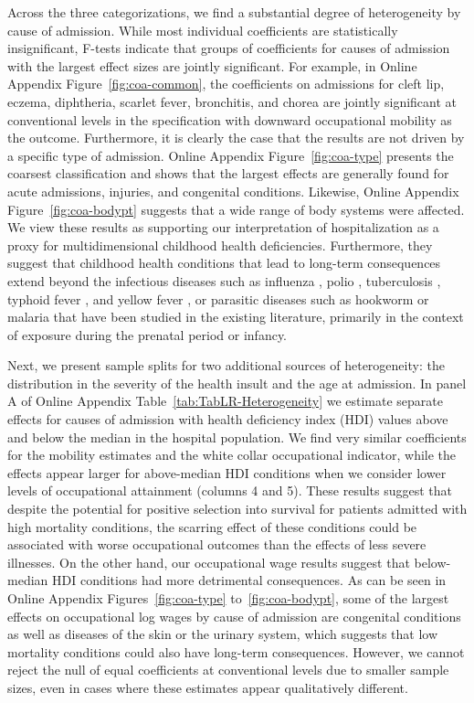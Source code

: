 \documentclass[12pt,english]{article}
\begin{document}
Across the three categorizations, we find a substantial degree of heterogeneity by cause of admission. While most individual coefficients are statistically insignificant, F-tests indicate that groups of coefficients for causes of admission with the largest effect sizes are jointly significant. For example, in Online Appendix Figure~\ref{fig:coa-common}, the coefficients on admissions for cleft lip, eczema, diphtheria, scarlet fever, bronchitis, and chorea are jointly significant at conventional levels in the specification with downward occupational mobility as the outcome. Furthermore, it is clearly the case that the results are not driven by a specific type of admission. Online Appendix Figure~\ref{fig:coa-type} presents the coarsest classification and shows that the largest effects are generally found for acute admissions, injuries, and congenital conditions. Likewise, Online Appendix Figure~\ref{fig:coa-bodypt} suggests that a wide range of body systems were affected. We view these results as supporting our interpretation of hospitalization as a proxy for multidimensional childhood health deficiencies. Furthermore, they suggest that childhood health conditions that lead to long-term consequences extend beyond the infectious diseases such as influenza \citep{Almond2006,BFS2018}, polio \citep{Gensowski2018}, tuberculosis \citep{ButikoferSalvanes2019}, typhoid fever \citep{Beach-etal2016}, and yellow fever \citep{Saavedra2017}, or parasitic diseases such as hookworm \citep{Bleakley2007} or malaria \citep{Barreca2010} that have been studied in the existing literature, primarily in the context of exposure during the prenatal period or infancy.

Next, we present sample splits for two additional sources of heterogeneity: the distribution in the severity of the health insult and the age at admission. In panel A of Online Appendix Table~\ref{tab:TabLR-Heterogeneity} we estimate separate effects for causes of admission with health deficiency index (HDI) values above and below the median in the hospital population. We find very similar coefficients for the mobility estimates and the white collar occupational indicator, while the effects appear larger for above-median HDI conditions when we consider lower levels of occupational attainment (columns 4 and 5). These results suggest that despite the potential for positive selection into survival for patients admitted with high mortality conditions, the scarring effect of these conditions could be associated with worse occupational outcomes than the effects of less severe illnesses. On the other hand, our occupational wage results suggest that below-median HDI conditions had more detrimental consequences. As can be seen in Online Appendix Figures~\ref{fig:coa-type} to~\ref{fig:coa-bodypt}, some of the largest effects on occupational log wages by cause of admission are congenital conditions as well as diseases of the skin or the urinary system, which suggests that low mortality conditions could also have long-term consequences. However, we cannot reject the null of equal coefficients at conventional levels due to smaller sample sizes, even in cases where these estimates appear qualitatively different.
\end{document}
